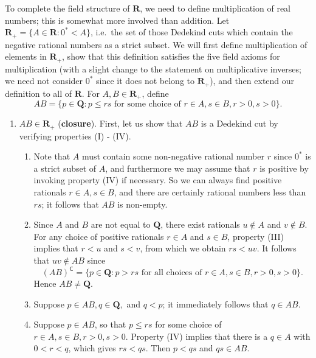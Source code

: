 \documentclass[12pt]{article}
\newcommand{\Q}{\mathbf{Q}}
\newcommand{\R}{\mathbf{R}}
\theoremstyle{definition}
\begin{document}
To complete the field structure of \( \R \), we need to define multiplication of real numbers; this is somewhat more involved than addition. Let \( \R_+ = \{ A \in \R : 0^* < A \} \), i.e.\ the set of those Dedekind cuts which contain the negative rational numbers as a strict subset. We will first define multiplication of elements in \( \R_+ \), show that this definition satisfies the five field axioms for multiplication (with a slight change to the statement on multiplicative inverses; we need not consider \( 0^* \) since it does not belong to \( \R_+ \)), and then extend our definition to all of \( \R \). For \( A, B \in \R_+ \), define
\[
    AB = \{ p \in \Q : p \leq rs \text{ for some choice of } r \in A, s \in B, r > 0, s > 0 \}.
\]
\begin{enumerate}[label = (M\arabic*)]
    \item \( AB \in \R_+ \) (\textbf{closure}). First, let us show that \( AB \) is a Dedekind cut by verifying properties (I) - (IV).
    
    \begin{enumerate}[label = (\Roman*)]
        \item Note that \( A \) must contain some non-negative rational number \( r \) since \( 0^* \) is a strict subset of \( A \), and furthermore we may assume that \( r \) is positive by invoking property (IV) if necessary. So we can always find positive rationals \( r \in A, s \in B \), and there are certainly rational numbers less than \( rs \); it follows that \( AB \) is non-empty.
        
        \item Since \( A \) and \( B \) are not equal to \( \Q \), there exist rationals \( u \not\in A \) and \( v \not\in B \). For any choice of positive rationals \( r \in A \) and \( s \in B \), property (III) implies that \( r < u \) and \( s < v \), from which we obtain \( rs < uv \). It follows that \( uv \not\in AB \) since
        \[
            (AB)^{\mathsf{C}} = \{ p \in \Q : p > rs \text{ for all choices of } r \in A, s \in B, r > 0, s > 0 \}.
        \]
        Hence \( AB \neq \Q \).
        
        \item Suppose \( p \in AB, q \in \Q, \) and \( q < p \); it immediately follows that \( q \in AB \).
        
        \item Suppose \( p \in AB \), so that \( p \leq rs \) for some choice of \( r \in A, s \in B, r > 0, s > 0 \). Property (IV) implies that there is a \( q \in A \) with \( 0 < r < q \), which gives \( rs < qs \). Then \( p < qs \) and \( qs \in AB \).
    \end{enumerate}
    

\end{enumerate}
\end{document}
